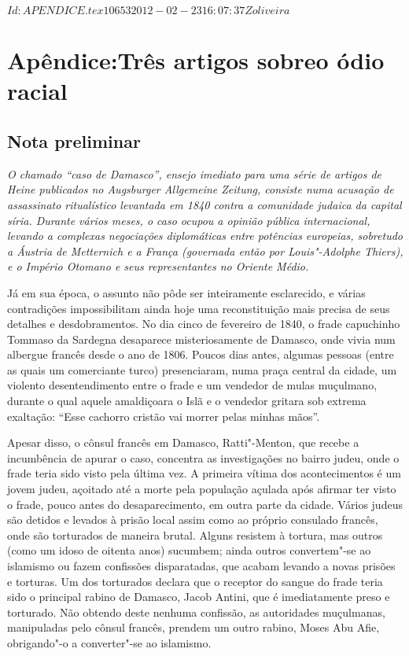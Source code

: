 \SVN $Id: APENDICE.tex 10653 2012-02-23 16:07:37Z oliveira $

\part[Apêndice: Três artigos\\ sobre o ódio racial]{Apêndice:\break Três artigos sobre\break o ódio racial}

\chapter{Nota preliminar}


{\itshape
O chamado “caso de Damasco”, ensejo imediato para uma série de artigos
de Heine publicados no \emph{Augsburger Allgemeine Zeitung}, consiste
numa acusação de assassinato ritualístico levantada em 1840 contra a
comunidade judaica da capital síria. Durante vários meses, o caso
ocupou a opinião pública internacional, levando a complexas negociações
diplomáticas entre potências europeias, sobretudo a Áustria de
Metternich e a França (governada então por Louis"-Adolphe Thiers), e o
Império Otomano e seus representantes no Oriente Médio.

Já em sua época, o assunto não pôde ser inteiramente esclarecido, e
várias contradições impossibilitam ainda hoje uma reconstituição mais
precisa de seus detalhes e desdobramentos. No dia cinco de fevereiro de
1840, o frade capuchinho Tommaso da Sardegna desaparece
misteriosamente de Damasco, onde vivia num albergue francês desde o ano
de 1806. Poucos dias antes, algumas pessoas (entre as quais um
comerciante turco) presenciaram, numa praça central da cidade, um
violento desentendimento entre o frade e um vendedor de mulas
muçulmano, durante o qual aquele amaldiçoara o Islã e o vendedor
gritara sob extrema exaltação: “Esse cachorro cristão vai morrer pelas
minhas mãos”.

Apesar disso, o cônsul francês em Damasco, Ratti"-Menton, que recebe a
incumbência de apurar o caso, concentra as investigações no bairro
judeu, onde o frade teria sido visto pela última vez. A primeira vítima
dos acontecimentos é um jovem judeu, açoitado até a morte pela
população açulada após afirmar ter visto o frade, pouco antes do
desaparecimento, em outra parte da cidade. Vários judeus são detidos e
levados à prisão local assim como ao próprio consulado francês, onde
são torturados de maneira brutal. Alguns resistem à tortura, mas outros
(como um idoso de oitenta anos) sucumbem; ainda outros convertem"-se
ao islamismo ou fazem confissões disparatadas, que acabam levando a
novas prisões e torturas. Um dos torturados declara que o receptor do
sangue do frade teria sido o principal rabino de Damasco, Jacob Antini,
que é imediatamente preso e torturado. Não obtendo deste nenhuma
confissão, as autoridades muçulmanas, manipuladas pelo cônsul francês,
prendem um outro rabino, Moses Abu Afie, obrigando"-o a converter"-se
ao islamismo.

}
